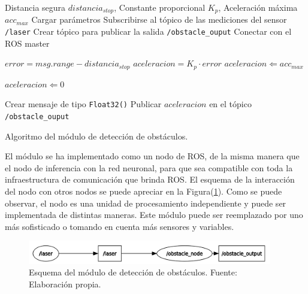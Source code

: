     \begin{algorithm}
        \begin{algorithmic}[1]
        \REQUIRE Distancia segura $distancia_{stop}$, Constante proporcional $K_p$, Aceleración máxima $acc_{max}$
        \STATE Cargar parámetros 
        \STATE Subscribirse al tópico de las mediciones del sensor \lstinline{/laser}
        \STATE Crear tópico para publicar la salida \lstinline{/obstacle_ouput}
        \STATE Conectar con el ROS master
        
                \STATE $error = msg.range - distancia_{stop}$
                \STATE $aceleracion = K_p\cdot error $
                    \STATE $aceleracion \Leftarrow acc_{max}$
                \ENDIF

                    \STATE $aceleracion \Leftarrow 0$
                \ENDIF

                \STATE Crear mensaje de tipo \lstinline{Float32()}
                \STATE Publicar $aceleracion$ en el tópico \lstinline{/obstacle_ouput}
            \ENDIF
        \ENDWHILE
        \end{algorithmic}
        \caption{Algoritmo del módulo de detección de obstáculos.}\label{alg:obstacle}
    \end{algorithm}

    El módulo se ha implementado como un nodo de ROS, de la misma manera que el nodo de inferencia con la red neuronal, para que 
    sea compatible con toda la infraestructura de comunicación que brinda ROS. El esquema de la interacción del nodo con otros nodos 
    se puede apreciar en la Figura(\ref{fig:nodosobs}). Como se puede observar, el nodo es una unidad de procesamiento independiente 
    y puede ser implementada de distintas maneras. Este módulo puede ser reemplazado por uno más sofisticado o tomando en cuenta más
    sensores y variables. 

    \begin{figure}[!h] 
        \centering
        \includegraphics[width=0.95\textwidth]{img/nodosobs}
        \caption[Esquema del módulo de detección de obstáculos]{Esquema del módulo de detección de obstáculos. Fuente: Elaboración propia. }
        \label{fig:nodosobs}
    \end{figure}

